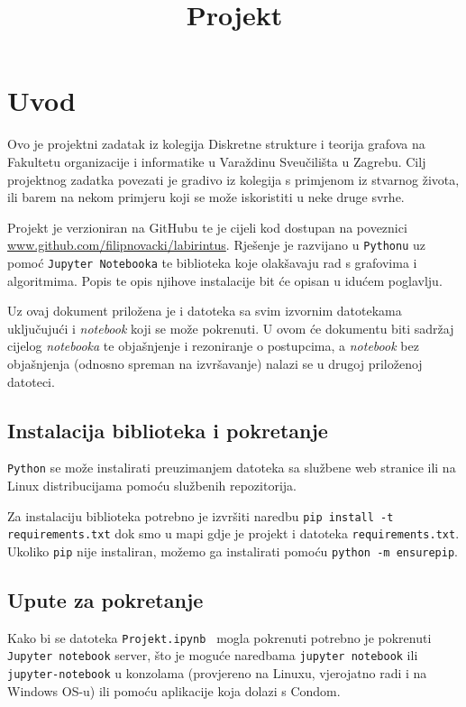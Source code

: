 \documentclass[11pt]{article}
\title{Projekt}
\begin{document}
	

	\section{Uvod}
	Ovo je projektni zadatak iz kolegija Diskretne strukture i teorija grafova na Fakultetu organizacije i informatike u Varaždinu Sveučilišta u Zagrebu. Cilj projektnog zadatka povezati je gradivo iz kolegija s primjenom iz stvarnog života, ili barem na nekom primjeru koji se može iskoristiti u neke druge svrhe.

	Projekt je verzioniran na GitHubu te je cijeli kod dostupan na poveznici \url{www.github.com/filipnovacki/labirintus}. Rješenje je razvijano u \texttt{Pythonu} uz pomoć \texttt{Jupyter Notebooka} te biblioteka koje olakšavaju rad s grafovima i algoritmima. Popis te opis njihove instalacije bit će opisan u idućem poglavlju.

	Uz ovaj dokument priložena je i datoteka sa svim izvornim datotekama uključujući i \textit{notebook} koji se može pokrenuti. U ovom će dokumentu biti sadržaj cijelog \textit{notebooka} te objašnjenje i rezoniranje o postupcima, a \textit{notebook} bez objašnjenja (odnosno spreman na izvršavanje) nalazi se u drugoj priloženoj datoteci.

	\subsection{Instalacija biblioteka i pokretanje}

	\texttt{Python} se može instalirati preuzimanjem datoteka sa službene web stranice ili na Linux distribucijama pomoću službenih repozitorija.

	Za instalaciju biblioteka potrebno je izvršiti naredbu \texttt{pip install -t requirements.txt} dok smo u mapi gdje je projekt i datoteka \texttt{requirements.txt}. Ukoliko \texttt{pip} nije instaliran, možemo ga instalirati pomoću \texttt{python -m ensurepip}.

	\subsection{Upute za pokretanje}

Kako bi se datoteka \texttt{Projekt.ipynb } mogla pokrenuti potrebno je
pokrenuti \texttt{Jupyter notebook} server, što je moguće naredbama
\texttt{jupyter notebook} ili \texttt{jupyter-notebook} u konzolama (provjereno
na Linuxu, vjerojatno radi i na Windows OS-u) ili pomoću aplikacije koja dolazi
s Condom.
\end{document}
